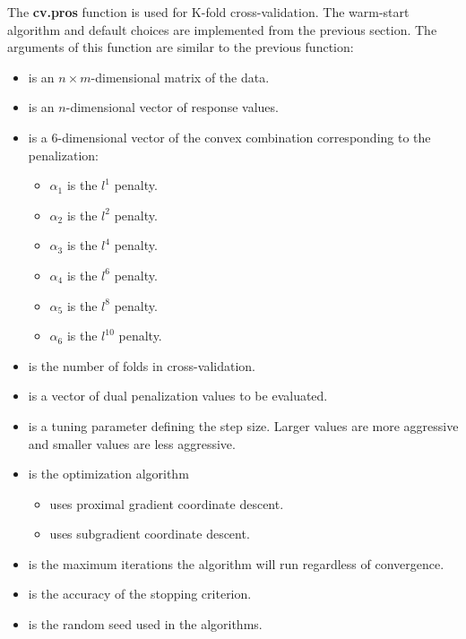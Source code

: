 \documentclass[article]{jss}
\numberwithin{equation}{section}
\begin{document}
The \textbf{cv.pros} function is used for K-fold cross-validation.
The warm-start algorithm and default choices are implemented from the previous section.
The arguments of this function are similar to the previous function:

\begin{itemize}
\item {} is an $n \times m$-dimensional matrix of the data.

\item {} is an $n$-dimensional vector of response values.

\item {} is a $6$-dimensional vector of the convex combination corresponding to the penalization:
 \begin{itemize}
   \item $\alpha_1$ is the $l^1$ penalty.
   \item $\alpha_2$ is the $l^2$ penalty.
   \item $\alpha_3$ is the $l^4$ penalty.
   \item $\alpha_4$ is the $l^6$ penalty.
   \item $\alpha_5$ is the $l^8$ penalty.
   \item $\alpha_6$ is the $l^{10}$ penalty.
\end{itemize}

\item {} is the number of folds in cross-validation.

\item {} is a vector of dual penalization values to be evaluated.

\item {} is a tuning parameter defining the step size. Larger values are more aggressive and smaller values are less aggressive.

\item {} is the optimization algorithm
\begin{itemize}
\item {} uses proximal gradient coordinate descent.
\item {} uses subgradient coordinate descent.
\end{itemize}

\item {} is the maximum iterations the algorithm will run regardless of convergence.

\item {} is the accuracy of the stopping criterion.

\item {} is the random seed used in the algorithms.

\end{itemize}
\end{document}
